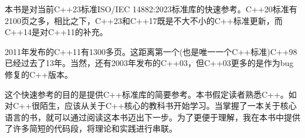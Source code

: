 本书是对当前C++23标准ISO/IEC 14882:2023标准库的快速参考。C++20标准有2100页之多，相比之下，C++23和C++17既是不大不小的C++标准更新，而C++14是对C++11的补充。

2011年发布的C++11有1300多页。这距离第一个(也是唯一一个C++标准)C++98已经过去了13年。当然，还有2003年发布的C++03，但C++03更多的是作为bug修复的C++版本。

这个快速参考的目的是提供C++标准库的简要参考。本书假定读者熟悉C++。如对C++很陌生，应该从关于C++核心的教科书开始学习。当掌握了一本关于核心语言的书，就可以通过阅读这本书迈出下一步。为了更便于理解，我在本书中提供了许多简短的代码段，将理论和实践进行串联。